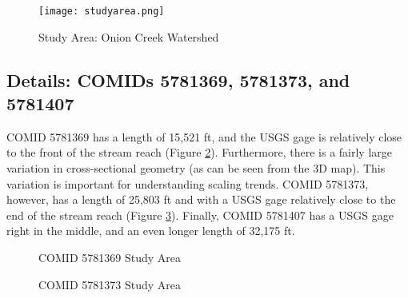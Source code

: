 \documentclass[12pt]{article}
\begin{document}
\begin{figure}[t]
  \centering
  \texttt{[image: studyarea.png]}
  \caption{Study Area: Onion Creek Watershed}\label{fig:onioncreekwatershed}
\end{figure} 

\subsection*{Details: COMIDs 5781369, 5781373, and 5781407}

COMID 5781369 has a length of 15,521 ft, and the USGS gage is relatively close to the front of the stream reach (Figure \ref{fig:5781369_studyarea}). Furthermore, there is a fairly large variation in cross-sectional geometry (as can be seen from the 3D map). This variation is important for understanding scaling trends. COMID 5781373, however, has a length of 25,803 ft and with a USGS gage relatively close to the end of the stream reach (Figure \ref{fig:5781373_studyarea}). Finally, COMID 5781407 has a USGS gage right in the middle, and an even longer length of 32,175 ft. 

\begin{figure}[h!]
\caption{COMID 5781369 Study Area} \label{fig:5781369_studyarea}
\end{figure}

\begin{figure}[h!]
\caption{COMID 5781373 Study Area} \label{fig:5781373_studyarea}
\end{figure}
\end{document}
